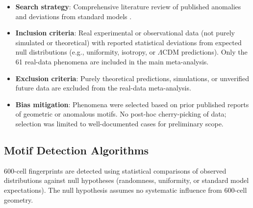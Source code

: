 \documentclass[11pt,a4paper]{article}
\begin{document}
\begin{itemize}
    \item \textbf{Search strategy}: Comprehensive literature review of published anomalies and deviations from standard models \cite{planck_anomalies,phyllotaxis2015,delft2015,pilotwave2024}.
    \item \textbf{Inclusion criteria}: Real experimental or observational data (not purely simulated or theoretical) with reported statistical deviations from expected null distributions (e.g., uniformity, isotropy, or $\Lambda$CDM predictions). Only the 61 real-data phenomena are included in the main meta-analysis.
    \item \textbf{Exclusion criteria}: Purely theoretical predictions, simulations, or unverified future data are excluded from the real-data meta-analysis.
    \item \textbf{Bias mitigation}: Phenomena were selected based on prior published reports of geometric or anomalous motifs. No post-hoc cherry-picking of data; selection was limited to well-documented cases for preliminary scope.
\end{itemize}

\subsection{Motif Detection Algorithms}

600-cell fingerprints are detected using statistical comparisons of observed distributions against null hypotheses (randomness, uniformity, or standard model expectations). The null hypothesis assumes no systematic influence from 600-cell geometry.
\end{document}
